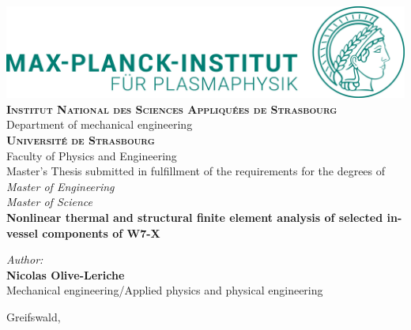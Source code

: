 \documentclass[twoside]{report}
\begin{document}
\begin{titlepage}
    \centering
    \includegraphics[scale=0.075, angle=0]{figures/logo.jpg}\\
    \vskip2cm
    {\bfseries\normalsize
        \textsc{Institut National des Sciences Appliquées de Strasbourg}
        \\
    }
    {\small
        Department of mechanical engineering\\
    }
    {\bfseries\normalsize
        \textsc{Université de Strasbourg}
        \\
    }
    {\small
        Faculty of Physics and Engineering\\
    }
    \vskip3cm
    {\normalsize
        Master’s Thesis submitted in fulfillment of the requirements for the degrees of\\
        \it Master of Engineering\\
        \it Master of Science\\
    }
     \vskip1cm
    {\bfseries\huge
        Nonlinear thermal and structural finite element analysis of selected in-vessel components of W7-X\\
    }
    \vskip3cm
    \setlength{\columnsep}{0cm}
    \begin{multicols}{2}
        \begin{flushleft}
        {\it\small{Author:}}
        \\
        {\bfseries\large{Nicolas Olive-Leriche}}
        \\ 
        {\normalsize{Mechanical engineering/Applied physics and physical engineering}}
        \\
        \end{flushleft}
    \columnbreak
    \end{multicols}
    \vskip1cm
    {\small
        Greifswald, \the\year\\
    }
\end{titlepage}
\end{document}
